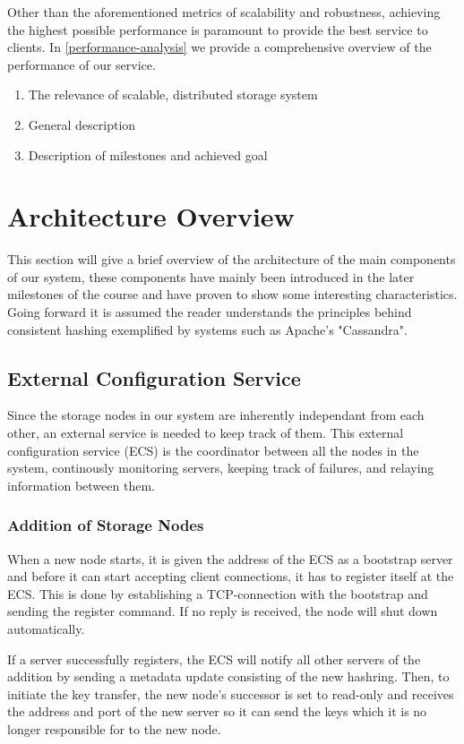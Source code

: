 \documentclass[sigconf]{acmart}
\begin{document}
Other than the aforementioned metrics of scalability and robustness, achieving the highest possible performance is paramount to provide the best service to clients. In \ref{performance-analysis} we provide a comprehensive overview of the performance of our service.
\begin{enumerate}
  \item The relevance of scalable, distributed storage system
  \item General description
  \item Description of milestones and achieved goal
\end{enumerate}
\section{Architecture Overview}\label{architecture-overview}
This section will give a brief overview of the architecture of the main components of our system, these components have mainly been introduced in the later milestones of the course and have proven to show some interesting characteristics. Going forward it is assumed the reader understands the principles behind consistent hashing exemplified by systems such as Apache's "Cassandra".
\subsection{External Configuration Service}
Since the storage nodes in our system are inherently independant from each other, an external service is needed to keep track of them. This external configuration service (ECS) is the coordinator between all the nodes in the system, continously monitoring servers, keeping track of failures, and relaying information between them.

\subsubsection{Addition of Storage Nodes}
When a new node starts, it is given the address of the ECS as a bootstrap server and before it can start accepting client connections, it has to register itself at the ECS. This is done by establishing a TCP-connection with the bootstrap and sending the register command.
If no reply is received, the node will shut down automatically.

If a server successfully registers, the ECS will notify all other servers of the addition by sending a metadata update consisting of the new hashring.
Then, to initiate the key transfer, the new node's successor is set to read-only and receives the address and port of the new server so it can send the keys which it is no longer responsible for to the new node.
\end{document}

